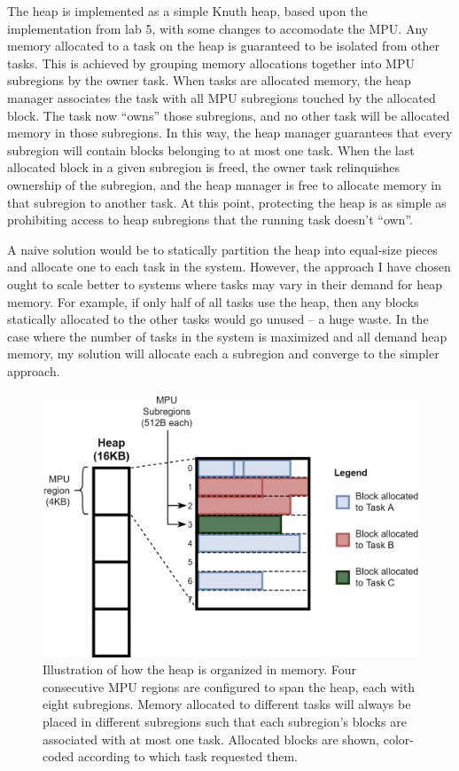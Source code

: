 The heap is implemented as a simple Knuth heap, based upon the implementation from lab 5, with some changes to accomodate the MPU. Any memory allocated to a task on the heap is guaranteed to be isolated from other tasks. This is achieved by grouping memory allocations together into MPU subregions by the owner task. When tasks are allocated memory, the heap manager associates the task with all MPU subregions touched by the allocated block. The task now ``owns'' those subregions, and no other task will be allocated memory in those subregions. In this way, the heap manager guarantees that every subregion will contain blocks belonging to at most one task. When the last allocated block in a given subregion is freed, the owner task relinquishes ownership of the subregion, and the heap manager is free to allocate memory in that subregion to another task. At this point, protecting the heap is as simple as prohibiting access to heap subregions that the running task doesn't ``own''.

A naive solution would be to statically partition the heap into equal-size pieces and allocate one to each task in the system. However, the approach I have chosen ought to scale better to systems where tasks may vary in their demand for heap memory. For example, if only half of all tasks use the heap, then any blocks statically allocated to the other tasks would go unused -- a huge waste. In the case where the number of tasks in the system is maximized and all demand heap memory, my solution will allocate each a subregion and converge to the simpler approach.

\begin{figure}[hbtp]
	\centering
	\includegraphics[width=0.7\linewidth]{figs/heap_prot.png}
	\caption{Illustration of how the heap is organized in memory. Four consecutive MPU regions are configured to span the heap, each with eight subregions. Memory allocated to different tasks will always be placed in different subregions such that each subregion's blocks are associated with at most one task. Allocated blocks are shown, color-coded according to which task requested them.}
	\label{fig:heap_prot}
\end{figure}

